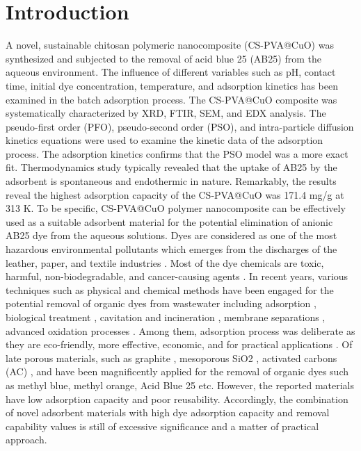 \documentclass[final,5p,times,twocolumn,authoryear]{elsarticle}
\begin{document}
\section{Introduction}
A novel, sustainable chitosan polymeric nanocomposite (CS-PVA@CuO) was synthesized and subjected to the removal of acid blue 25 (AB25) from the aqueous environment. The influence of different variables such as pH, contact time, initial dye concentration, temperature, and adsorption kinetics has been examined in the batch adsorption process. The CS-PVA@CuO composite was systematically characterized by XRD, FTIR, SEM, and EDX analysis. The pseudo-first order (PFO), pseudo-second order (PSO), and intra-particle diffusion kinetics equations were used to examine the kinetic data of the adsorption process. The adsorption kinetics confirms that the PSO model was a more exact fit. Thermodynamics study typically revealed that the uptake of AB25 by the adsorbent is spontaneous and endothermic in nature. Remarkably, the results reveal the highest adsorption capacity of the CS-PVA@CuO was 171.4 mg/g at 313 K. To be specific, CS-PVA@CuO polymer nanocomposite can be effectively used as a suitable adsorbent material for the potential elimination of anionic AB25 dye from the aqueous solutions.
Dyes are considered as one of the most hazardous environmental pollutants which emerges from the discharges of the leather, paper, and textile industries \cite{1,2}. Most of the dye chemicals are toxic, harmful, non-biodegradable, and cancer-causing agents \cite{3--5}. In recent years, various techniques such as physical and chemical methods have been engaged for the potential removal of organic dyes from wastewater including adsorption \cite{6,7}, biological treatment \cite{8}, cavitation and incineration \cite{9--11}, membrane separations \cite{12,13}, advanced oxidation processes \cite{14}. Among them, adsorption process was deliberate as they are eco-friendly, more effective, economic, and for practical applications \cite{15,16}. Of late porous materials, such as graphite \cite{17}, mesoporous SiO2 \cite{18}, activated carbons (AC) \cite{17}, and have been magnificently applied for the removal of organic dyes such as methyl blue, methyl orange, Acid Blue 25 etc. However, the reported materials have low adsorption capacity and poor reusability. Accordingly, the combination of novel adsorbent materials with high dye adsorption capacity and removal capability values is still of excessive significance and a matter of practical approach.
\end{document}
